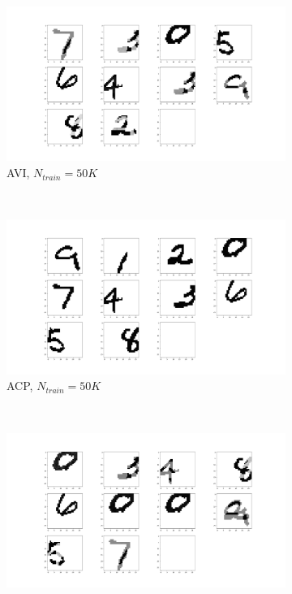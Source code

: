 \documentclass[twoside]{article}
\begin{document}
\begin{figure}
    \centering
    \begin{subfigure}[t]{0.2\textwidth}
        \centering
        \includegraphics[width=1.0\linewidth]{avi2.png}
        \caption{AVI, $N_{train}=50K$}
        \label{fig: avi50000}
    \end{subfigure}%
    ~
    \begin{subfigure}[t]{0.2\textwidth}
        \centering
        \includegraphics[width=1.0\linewidth]{ubacp50000.png}
        \caption{ACP, $N_{train}=50K$}
        \label{fig: ACP50000}
    \end{subfigure}%
    ~
    \begin{subfigure}[t]{0.2\textwidth}
        \centering
        \includegraphics[width=1.0\linewidth]{avi_8000.png}

\end{subfigure}
\end{figure}
\end{document}
